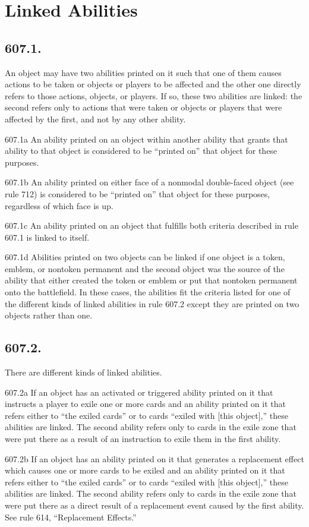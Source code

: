 \section{Linked Abilities}
\subsection*{607.1.}
An object may have two abilities printed on it such that one of them causes actions to be taken or objects or players to be affected and the other one directly refers to those actions, objects, or players. If so, these two abilities are linked: the second refers only to actions that were taken or objects or players that were affected by the first, and not by any other ability.

607.1a An ability printed on an object within another ability that grants that ability to that object is considered to be “printed on” that object for these purposes.

607.1b An ability printed on either face of a nonmodal double-faced object (see rule 712) is considered to be “printed on” that object for these purposes, regardless of which face is up.

607.1c An ability printed on an object that fulfills both criteria described in rule 607.1 is linked to itself.

607.1d Abilities printed on two objects can be linked if one object is a token, emblem, or nontoken permanent and the second object was the source of the ability that either created the token or emblem or put that nontoken permanent onto the battlefield. In these cases, the abilities fit the criteria listed for one of the different kinds of linked abilities in rule 607.2 except they are printed on two objects rather than one.

\subsection*{607.2.}
There are different kinds of linked abilities.

607.2a If an object has an activated or triggered ability printed on it that instructs a player to exile one or more cards and an ability printed on it that refers either to “the exiled cards” or to cards “exiled with [this object],” these abilities are linked. The second ability refers only to cards in the exile zone that were put there as a result of an instruction to exile them in the first ability.

607.2b If an object has an ability printed on it that generates a replacement effect which causes one or more cards to be exiled and an ability printed on it that refers either to “the exiled cards” or to cards “exiled with [this object],” these abilities are linked. The second ability refers only to cards in the exile zone that were put there as a direct result of a replacement event caused by the first ability. See rule 614, “Replacement Effects.”

